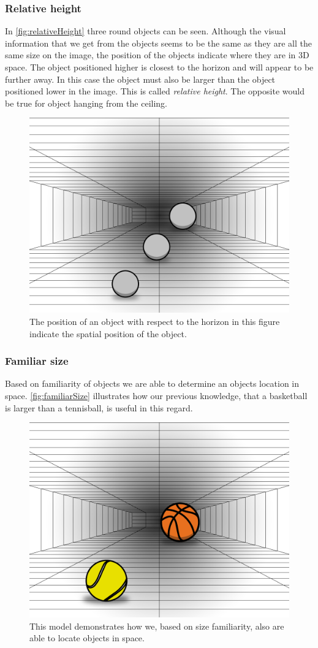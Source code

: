 \subsubsection{Relative height}\label{sec:relativeHeight}
In \autoref{fig:relativeHeight} three round objects can be seen. Although the visual information that we get from the objects seems to be the same as they are all the same size on the image, the position of the objects indicate where they are in 3D space. The object positioned higher is closest to the horizon and will appear to be further away. In this case the object must also be larger than the object positioned lower in the image. This is called \textit{relative height}. The opposite would be true for object hanging from the ceiling\citep[p.~198]{sensationPerception}.

\begin{figure}[H]
	\centering
	\includegraphics[width=0.6\linewidth]{figure/Analysis/relativeHeight.png}
	\caption{The position of an object with respect to the horizon in this figure indicate the spatial position of the object.}
	\label{fig:relativeHeight}
\end{figure}

\subsubsection{Familiar size}
Based on familiarity of objects we are able to determine an objects location in space. \autoref{fig:familiarSize} illustrates how our previous knowledge, that a basketball is larger than a tennisball, is useful in this regard.
\citep[p.~200]{sensationPerception}
\begin{figure}[H]
	\centering
	\includegraphics[width=0.6\linewidth]{figure/Analysis/familiarSize.png}
	\caption{This model demonstrates how we, based on size familiarity, also are able to locate objects in space.}
	\label{fig:familiarSize}
\end{figure}

